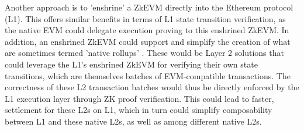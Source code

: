 Another approach is to 'enshrine' a ZkEVM directly into the Ethereum protocol (L1).
This offers similar benefits in terms of L1 state transition verification, as
the native EVM could delegate execution proving to this enshrined ZkEVM. In
addition, an enshrined ZkEVM could support and simplify the creation of what
are sometimes termed 'native rollups' \cite{NativeRollups}. These would be
Layer 2 solutions that could leverage the L1's enshrined ZkEVM for verifying
their own state transitions, which are themselves batches of EVM-compatible
transactions. The correctness of these L2 transaction batches would thus be
directly enforced by the L1 execution layer through ZK proof verification.
This could lead to faster, settlement for these L2s on L1, which in turn could
simplify composability between L1 and these native L2s, as well as among
different native L2s.

